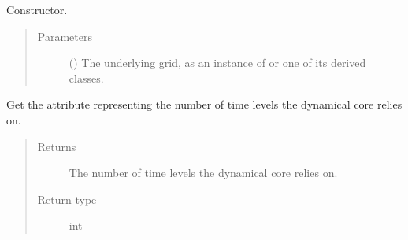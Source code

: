 \documentclass[letterpaper,10pt,english]{sphinxmanual}
\begin{document}
\begin{fulllineitems}
\begin{fulllineitems}
\begin{quote}
\begin{description}
\begin{itemize}
\end{itemize}


\end{description}\end{quote}

\end{fulllineitems}


\begin{fulllineitems}
\label{\detokenize{api:parameterizations.adjustments.Adjustment.__init__}}
Constructor.
\begin{quote}\begin{description}
\item[{Parameters}] \leavevmode
{} () \textendash{} The underlying grid, as an instance of {\hyperref[\detokenize{api:grids.grid_xyz.GridXYZ}]{}} or one of its derived classes.

\end{description}\end{quote}

\end{fulllineitems}


\begin{fulllineitems}
\label{\detokenize{api:parameterizations.adjustments.Adjustment.time_levels}}
Get the attribute representing the number of time levels the dynamical core relies on.
\begin{quote}\begin{description}
\item[{Returns}] \leavevmode
The number of time levels the dynamical core relies on.

\item[{Return type}] \leavevmode
int

\end{description}\end{quote}

\end{fulllineitems}


\end{fulllineitems}

\end{document}
